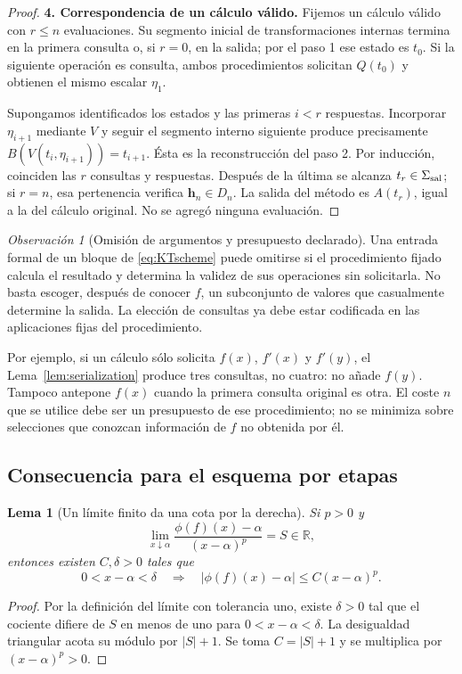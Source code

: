 \documentclass[11pt,a4paper]{article}
\numberwithin{equation}{section}
\newtheorem{lemma}[theorem]{Lema}
\theoremstyle{definition}
\theoremstyle{remark}
\newtheorem{remark}[theorem]{Observación}
\newcommand{\R}{\mathbb R}
\newcommand{\hc}{\mathbf h}
\newcommand{\paso}[1]{\par\smallskip\noindent\textbf{#1}\quad}
\begin{document}
\begin{proof}
\paso{4. Correspondencia de un cálculo válido.}
Fijemos un cálculo válido con $r\le n$ evaluaciones. Su segmento inicial de transformaciones internas termina en la primera consulta o, si $r=0$, en la salida; por el paso 1 ese estado es $t_0$. Si la siguiente operación es consulta, ambos procedimientos solicitan $Q(t_0)$ y obtienen el mismo escalar $\eta_1$.

Supongamos identificados los estados y las primeras $i<r$ respuestas. Incorporar $\eta_{i+1}$ mediante $V$ y seguir el segmento interno siguiente produce precisamente $B(V(t_i,\eta_{i+1}))=t_{i+1}$. Ésta es la reconstrucción del paso 2. Por inducción, coinciden las $r$ consultas y respuestas. Después de la última se alcanza $t_r\in\Sigma_{\rm sal}$; si $r=n$, esa pertenencia verifica $\hc_n\in D_n$. La salida del método es $A(t_r)$, igual a la del cálculo original. No se agregó ninguna evaluación.
\end{proof}

\begin{remark}[Omisión de argumentos y presupuesto declarado]
Una entrada formal de un bloque de \eqref{eq:KTscheme} puede omitirse si el procedimiento fijado calcula el resultado y determina la validez de sus operaciones sin solicitarla. No basta escoger, después de conocer $f$, un subconjunto de valores que casualmente determine la salida. La elección de consultas ya debe estar codificada en las aplicaciones fijas del procedimiento.

Por ejemplo, si un cálculo sólo solicita $f(x)$, $f'(x)$ y $f'(y)$, el Lema~\ref{lem:serialization} produce tres consultas, no cuatro: no añade $f(y)$. Tampoco antepone $f(x)$ cuando la primera consulta original es otra. El coste $n$ que se utilice debe ser un presupuesto de ese procedimiento; no se minimiza sobre selecciones que conozcan información de $f$ no obtenida por él.
\end{remark}

\subsection{Consecuencia para el esquema por etapas}
\begin{lemma}[Un límite finito da una cota por la derecha]\label{lem:rightbound}
Si $p>0$ y
\[
\lim_{x\downarrow\alpha}\frac{\phi(f)(x)-\alpha}{(x-\alpha)^p}=S\in\R,
\]
entonces existen $C,\delta>0$ tales que
\[
0<x-\alpha<\delta\quad\Longrightarrow\quad
|\phi(f)(x)-\alpha|\le C(x-\alpha)^p.
\]
\end{lemma}
\begin{proof}
Por la definición del límite con tolerancia uno, existe $\delta>0$ tal que el cociente difiere de $S$ en menos de uno para $0<x-\alpha<\delta$. La desigualdad triangular acota su módulo por $|S|+1$. Se toma $C=|S|+1$ y se multiplica por $(x-\alpha)^p>0$.
\end{proof}
\end{document}
